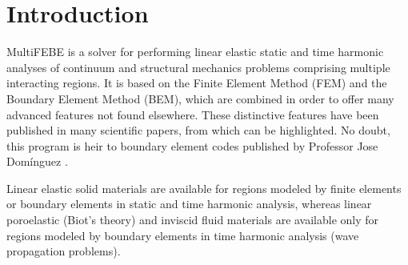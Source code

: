 \documentclass[a4paper,fleqn]{book}
\begin{document}
\section{Introduction}

MultiFEBE is a solver for performing linear elastic static and time harmonic analyses of continuum and structural mechanics problems comprising multiple interacting regions. It is based on the Finite Element Method (FEM) and the Boundary Element Method (BEM), which are combined in order to offer many advanced features not found elsewhere. These distinctive features have been published in many scientific papers, from which \cite{maeso2004,aznarez2006,padron2007,alamo2016,bordon2017} can be highlighted. No doubt, this program is heir to boundary element codes published by Professor Jose Dom\'inguez \cite{dominguez1993}.

Linear elastic solid materials are available for regions modeled by finite elements or boundary elements in static and time harmonic analysis, whereas linear poroelastic (Biot's theory) and inviscid fluid materials are available only for regions modeled by boundary elements in time harmonic analysis (wave propagation problems).
\end{document}
